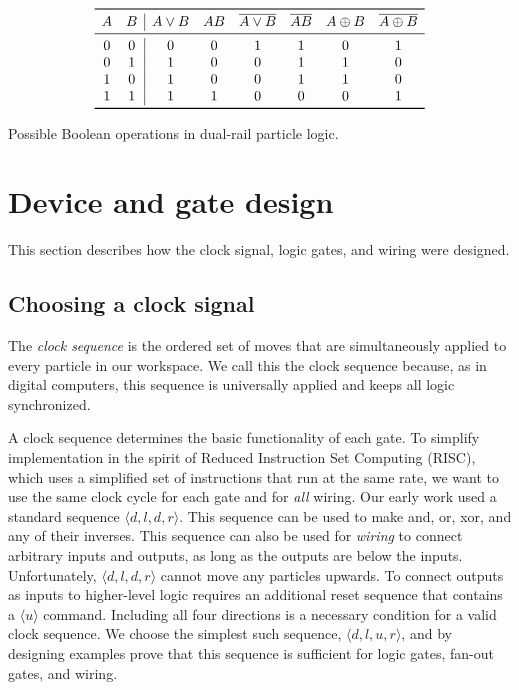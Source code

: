 \documentclass[letterpaper, 10 pt, conference]{ieeeconf}
\begin{document}
\begin{table}
\begin{displaymath}
\begin{array}{cc|cccccc}
\toprule
   A & B & A\lor{}B & AB & \overline{A\lor{}B} & \overline{AB} & A\oplus B & \overline{A\oplus B} \\
\midrule
0 & 0 & 0 & 0 & 1 & 1 & 0 & 1 \\
0 & 1 & 1 & 0 & 0 & 1 & 1 & 0 \\
1 & 0 & 1 & 0 & 0 & 1 & 1 & 0 \\
1 & 1 & 1 & 1 & 0 & 0 & 0 & 1 \\
\bottomrule
\end{array}
\end{displaymath}
  \caption{Possible Boolean operations in dual-rail particle logic.}
  \label{tab:dualRailParticleLogic}
\end{table}

\section{Device and gate design}\label{sec:Design}
This section describes how the clock signal, logic gates, and wiring were designed.
\subsection{Choosing a clock signal}

The \emph{clock sequence} is the ordered set of moves that are simultaneously applied to every particle in our workspace. We call this the clock sequence because, as in digital computers, this sequence is universally applied and keeps all logic synchronized.

A clock sequence determines the basic functionality of each gate.  To simplify implementation in the spirit of Reduced Instruction Set Computing (RISC), which uses a simplified set of instructions that run at the same rate, we want to use the same clock cycle for each gate and for \emph{all} wiring. 
Our early work used a standard sequence  $\langle d,l,d,r \rangle$.  This sequence can be used to make {\sc and, or, xor}, and any of their inverses.  This sequence can also be used for \emph{wiring} to connect arbitrary inputs and outputs, as long as the outputs are below the inputs.  Unfortunately, $\langle d,l,d,r \rangle$ cannot move any particles upwards. To connect outputs as inputs to higher-level logic requires an additional reset sequence that contains a $\langle u \rangle$ command.  Including all four directions is a necessary condition for a valid clock sequence.  We choose the simplest such sequence, $\langle d,l,u,r \rangle$, and by designing examples prove that this sequence is sufficient for logic gates, {\sc fan-out} gates, and wiring.
\end{document}
